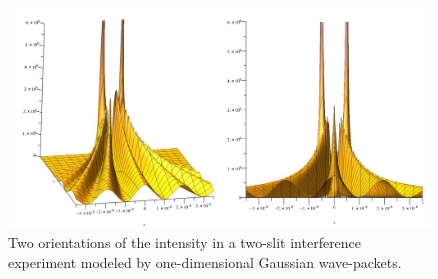 \documentclass[12pt]{article}       %
\begin{document}
\newpage
\begin{figure}[h]
\unitlength=1in
\hspace*{0.7in}\includegraphics[width=4.6in,height=2.3in]{figure3.jpg}
\caption{Two orientations of the intensity in a two-slit interference  experiment modeled by  one-dimensional Gaussian wave-packets.\label{INT1DG}}
\end{figure}
\end{document}
